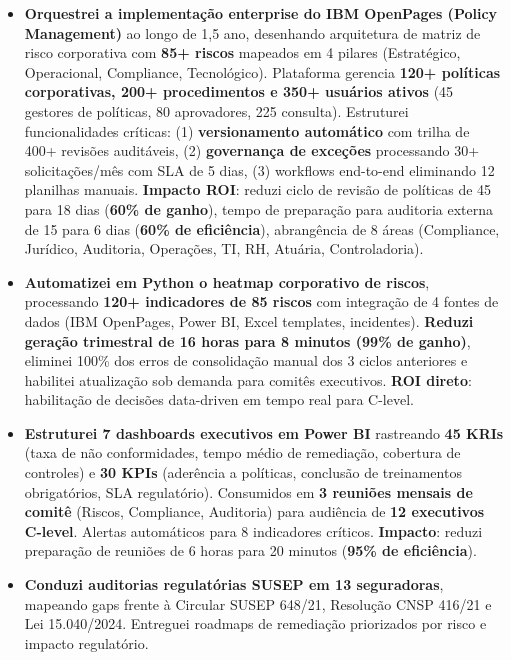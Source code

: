 \documentclass[10pt, a4paper]{article}
\newcommand{\achievement}[1]{%
  \item[\textcolor{ExecutiveNavy}{\textbf{•}}] \RaggedRight #1%
}
\begin{document}
\begin{itemize}[leftmargin=1.2em, itemsep=0.3em, parsep=0pt, topsep=0.3em]

\achievement{\textbf{Orquestrei a implementação enterprise do IBM OpenPages (Policy Management)} ao longo de 1,5 ano, desenhando arquitetura de matriz de risco corporativa com \textbf{85+ riscos} mapeados em 4 pilares (Estratégico, Operacional, Compliance, Tecnológico). Plataforma gerencia \textbf{120+ políticas corporativas, 200+ procedimentos e 350+ usuários ativos} (45 gestores de políticas, 80 aprovadores, 225 consulta). Estruturei funcionalidades críticas: (1) \textbf{versionamento automático} com trilha de 400+ revisões auditáveis, (2) \textbf{governança de exceções} processando 30+ solicitações/mês com SLA de 5 dias, (3) workflows end-to-end eliminando 12 planilhas manuais. \textbf{Impacto ROI}: reduzi ciclo de revisão de políticas de 45 para 18 dias (\textbf{60\% de ganho}), tempo de preparação para auditoria externa de 15 para 6 dias (\textbf{60\% de eficiência}), abrangência de 8 áreas (Compliance, Jurídico, Auditoria, Operações, TI, RH, Atuária, Controladoria).}

\achievement{\textbf{Automatizei em Python o heatmap corporativo de riscos}, processando \textbf{120+ indicadores de 85 riscos} com integração de 4 fontes de dados (IBM OpenPages, Power BI, Excel templates, incidentes). \textbf{Reduzi geração trimestral de 16 horas para 8 minutos (99\% de ganho)}, eliminei 100\% dos erros de consolidação manual dos 3 ciclos anteriores e habilitei atualização sob demanda para comitês executivos. \textbf{ROI direto}: habilitação de decisões data-driven em tempo real para C-level.}

\achievement{\textbf{Estruturei 7 dashboards executivos em Power BI} rastreando \textbf{45 KRIs} (taxa de não conformidades, tempo médio de remediação, cobertura de controles) e \textbf{30 KPIs} (aderência a políticas, conclusão de treinamentos obrigatórios, SLA regulatório). Consumidos em \textbf{3 reuniões mensais de comitê} (Riscos, Compliance, Auditoria) para audiência de \textbf{12 executivos C-level}. Alertas automáticos para 8 indicadores críticos. \textbf{Impacto}: reduzi preparação de reuniões de 6 horas para 20 minutos (\textbf{95\% de eficiência}).}

\achievement{\textbf{Conduzi auditorias regulatórias SUSEP em 13 seguradoras}, mapeando gaps frente à Circular SUSEP 648/21, Resolução CNSP 416/21 e Lei 15.040/2024. Entreguei roadmaps de remediação priorizados por risco e impacto regulatório.}


\end{itemize}
\end{document}

